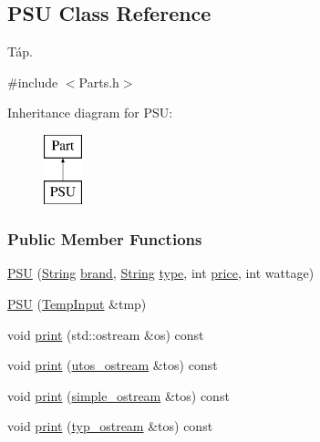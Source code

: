 \subsection{P\+SU Class Reference}
\label{class_p_s_u}


Táp.  




{\ttfamily \#include $<$Parts.\+h$>$}

Inheritance diagram for P\+SU\+:\begin{figure}[H]
\begin{center}
\leavevmode
\includegraphics[height=2.000000cm]{class_p_s_u}
\end{center}
\end{figure}
\subsubsection*{Public Member Functions}
\begin{DoxyCompactItemize}
\item 
\mbox{\hyperlink{class_p_s_u_a1077b85dde400327880d6f37ebaeef49}{P\+SU}} (\mbox{\hyperlink{class_string}{String}} \mbox{\hyperlink{class_part_ae06f2fdeb7fbbdb229a7aca151f3e341}{brand}}, \mbox{\hyperlink{class_string}{String}} \mbox{\hyperlink{class_part_a101dbcc5c4b21564df7414c7eb0eae88}{type}}, int \mbox{\hyperlink{class_part_a8e71223aed1da95a974f33d8d6c91bb1}{price}}, int wattage)
\item 
\mbox{\hyperlink{class_p_s_u_a2e8661030cac1d31c85deeb9f7763567}{P\+SU}} (\mbox{\hyperlink{struct_temp_input}{Temp\+Input}} \&tmp)
\item 
void \mbox{\hyperlink{class_p_s_u_ad8f95676e09f5ba805dbba50759f44ba}{print}} (std\+::ostream \&os) const
\item 
void \mbox{\hyperlink{class_p_s_u_a81c74aa3a327003c58b89ca2b8602c1d}{print}} (\mbox{\hyperlink{structutos__ostream}{utos\+\_\+ostream}} \&tos) const
\item 
void \mbox{\hyperlink{class_p_s_u_a57f14e0dee163f33d01cdbb159b6d9d6}{print}} (\mbox{\hyperlink{structsimple__ostream}{simple\+\_\+ostream}} \&tos) const
\item 
void \mbox{\hyperlink{class_p_s_u_a3690cd51ec36d4a1417c22612793e01c}{print}} (\mbox{\hyperlink{structtyp__ostream}{typ\+\_\+ostream}} \&tos) const
\end{DoxyCompactItemize}
